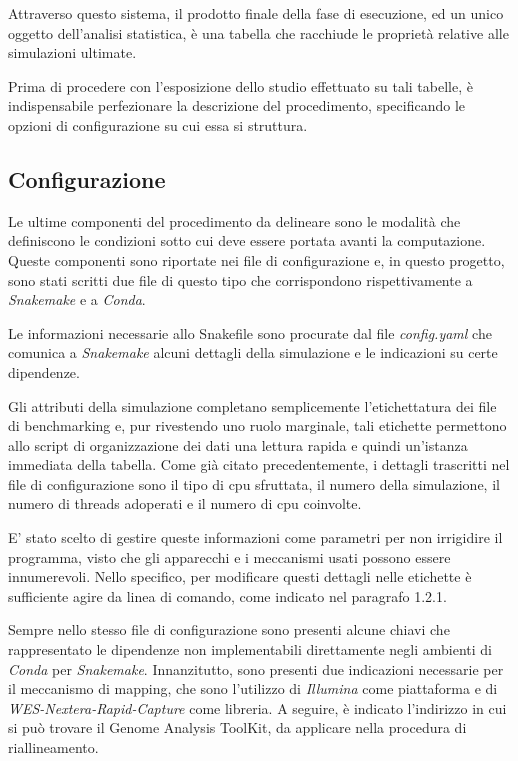 Attraverso questo sistema, il prodotto finale della fase di esecuzione, ed un unico oggetto dell'analisi statistica, è una tabella che racchiude le proprietà relative alle simulazioni ultimate.


Prima di procedere con l'esposizione dello studio effettuato su tali tabelle, è indispensabile perfezionare la descrizione del procedimento, specificando le opzioni di configurazione su cui essa si struttura.


\subsection{Configurazione}
Le ultime componenti del procedimento da delineare sono le modalità che definiscono le condizioni sotto cui deve essere portata avanti la computazione.
Queste componenti sono riportate nei file di configurazione e, in questo progetto, sono stati scritti due file di questo tipo che corrispondono rispettivamente a \textit{Snakemake} e a \textit{Conda}.

Le informazioni necessarie allo Snakefile sono procurate dal file \textit{config.yaml} che comunica a \textit{Snakemake} alcuni dettagli della simulazione e le indicazioni su certe dipendenze.


Gli attributi della simulazione completano semplicemente l'etichettatura dei file di benchmarking e, pur rivestendo uno ruolo marginale, tali etichette permettono allo script di organizzazione dei dati una lettura rapida e quindi un'istanza immediata della tabella.
Come già citato precedentemente, i dettagli trascritti nel file di configurazione sono il tipo di cpu sfruttata, il numero della simulazione, il numero di threads adoperati e il numero di cpu coinvolte.

E' stato scelto di gestire queste informazioni come parametri per non irrigidire il programma, visto che gli apparecchi e i meccanismi usati possono essere innumerevoli.
Nello specifico, per modificare questi dettagli nelle etichette è sufficiente agire da linea di comando, come indicato nel paragrafo 1.2.1.

Sempre nello stesso file di configurazione sono presenti alcune chiavi che rappresentato le dipendenze non implementabili direttamente negli ambienti di \textit{Conda} per \textit{Snakemake}.
Innanzitutto, sono presenti due indicazioni necessarie per il meccanismo di mapping, che sono l'utilizzo di \textit{Illumina} come piattaforma e di \textit{WES-Nextera-Rapid-Capture} come libreria.
A seguire, è indicato l'indirizzo in cui si può trovare il Genome Analysis ToolKit, da applicare nella procedura di riallineamento.

